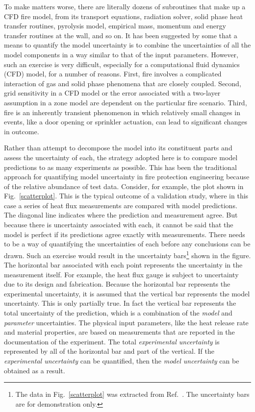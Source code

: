To make matters worse, there are literally dozens of subroutines that make up a CFD fire model,
from its transport equations, radiation solver, solid phase heat transfer routines, pyrolysis model,
empirical mass, momentum and energy transfer routines at the wall, and so on.
It has been suggested by some that
a means to quantify the model uncertainty is to combine the uncertainties of all the model
components in a way similar to that of the input parameters.
However, such an exercise is very difficult, especially for a computational fluid dynamics (CFD) model,
for a number of reasons. First, fire involves
a complicated interaction of gas and solid phase phenomena that are closely coupled.
Second, grid sensitivity in a CFD model or the error associated with
a two-layer assumption in a zone model are dependent on the particular fire scenario.
Third, fire is an inherently transient phenomenon in which relatively small
changes in events, like a door opening or sprinkler actuation, can lead to significant changes in outcome.

Rather than attempt to decompose the model into its constituent parts and assess the uncertainty of
each, the strategy adopted here is to compare model predictions to as many
experiments as possible. This has been the traditional approach for quantifying model uncertainty in fire
protection engineering because of the relative abundance of test data. Consider, for example, the
plot shown in Fig.~\ref{scatterplot}. This is the typical outcome of a validation study, where in this case a series of
heat flux measurements are compared with model predictions.
The diagonal line indicates where the prediction and measurement agree.
But because there is uncertainty associated with each, it cannot be said that the model is perfect if its predictions
agree exactly with measurements.
There needs to be a way of quantifying the uncertainties of each before any conclusions can be drawn.
Such an exercise would result in the uncertainty
bars\footnote{The data in Fig.~\ref{scatterplot} was extracted from Ref.~\cite{NUREG_1824}.
The uncertainty bars are for demonstration only.}
shown in the figure. The
horizontal bar associated with each point represents the uncertainty in the measurement itself.
For example, the heat flux gauge is subject to uncertainty due to its design and fabrication.
Because the horizontal bar represents the experimental uncertainty, it is assumed that the vertical
bar represents the model uncertainty. This is only partially true. In fact the vertical bar represents the total
uncertainty of the prediction, which is a combination of the {\em model} and {\em parameter} uncertainties. The physical
input parameters, like the heat release rate and material properties, are based on measurements that are reported
in the documentation of the experiment.
The total {\em experimental uncertainty} is represented by all of the horizontal bar and part of the vertical.
If the {\em experimental uncertainty} can be quantified, then the {\em model uncertainty} can be obtained as a result.


